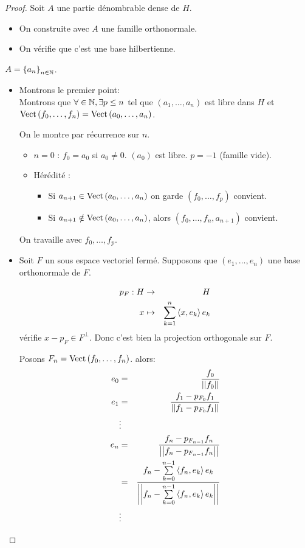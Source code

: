 \begin{proof}
	Soit $A$ une partie dénombrable dense de $H$.

	\begin{itemize}
		\item On construite avec $A$ une famille orthonormale.
		\item On vérifie que c'est une base hilbertienne.
	\end{itemize}

	$A = \left\{ a_n \right\}_{n\in \mathbb{N}}$.

	\begin{itemize}
		\item Montrons le premier point:\\

		      Montrons que $\forall  \in \mathbb{N}, \exists p \leq n$ tel que $(a_1, \dots, a_n)$ est libre dans $H$ et $\text{Vect}\left( f_0, \dots, f_n \right) = \text{Vect}\left( a_0, \dots, a_n \right)$.

		      On le montre par récurrence sur $n$.

		      \begin{itemize}
			      \item $n=0$ : $f_0 = a_0$ si $a_0 \neq 0$. $(a_0)$ est libre. $p = -1$ (famille vide).
			      \item Hérédité :
			            \begin{itemize}
				            \item Si $a_{n+1} \in \text{Vect}\left( a_0, \dots , a_n \right)$ on garde $(f_0, \dots, f_p)$ convient.
				            \item Si $a_{n+1} \notin \text{Vect}\left( a_0, \dots , a_n \right)$, alors $(f_0, \dots, f_n, a_{n+1})$ convient.
			            \end{itemize}
		      \end{itemize}

		      On travaille avec $f_0, \dots, f_p$.
		\item Soit $F$ un sous espace vectoriel fermé. Supposons que $(e_1, \dots, e_n)$ une base orthonormale de $F$.

		      \begin{eqnarray*}
			      p_F: H & \to & H \\
			      x & \mapsto & \sum_{k=1}^n \left\langle x, e_k \right\rangle e_k
		      \end{eqnarray*}
		      vérifie $x - p_F \in F^{\perp}$. Donc c'est bien la projection orthogonale sur $F$.

		      Posons $F_n = \text{Vect}\left( f_0, \dots, f_n \right)$.
		      alors:
		      \begin{eqnarray*}
			      e_0 &=& \frac {f_0} {\left|\left|f_0\right|\right|} \\
			      e_1 &=& \frac {f_1 - p_{F_0} f_1} {\left|\left|f_1 - p_{F_0} f_1\right|\right|} \\
			      &\vdots& \\
			      e_n &=& \frac {f_n - p_{F_{n-1}} f_n} {\left|\left|f_n - p_{F_{n-1}} f_n\right|\right|}\\
			      &=& \frac {f_n - \sum\limits_{k=0}^{n-1} \left\langle f_n, e_k \right\rangle e_k} {\left|\left|f_n - \sum\limits_{k=0}^{n-1} \left\langle f_n, e_k \right\rangle e_k\right|\right|} \\
			      &\vdots&
		      \end{eqnarray*}


\end{itemize}
\end{proof}
